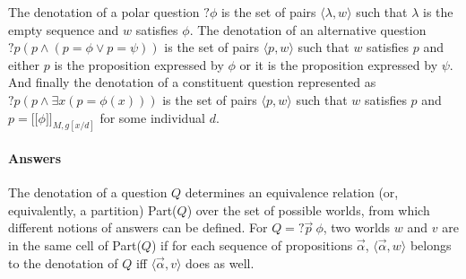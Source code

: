 \documentclass[a4paper, 11pt]{article}
\newcommand\notext[1]{}
\newcommand{\lin}{\ensuremath{\lbrack\!\lbrack}}
\newcommand{\rin}{\ensuremath{\rbrack\!\rbrack}}
\begin{document}
 
  
\noindent The denotation of a  polar question $?  \phi$ is the set of pairs $\langle  \lambda, w \rangle$ such that $\lambda$ is the empty sequence and $w$ satisfies $ \phi$.
 The denotation of an alternative question $?p (p \wedge    (p=\phi \vee p=\psi))$ is the set of pairs $\langle  p, w \rangle$ such that $w$ satisfies $p$ and either $p$ is the proposition expressed by $ \phi $ or it is the proposition expressed by $  \psi $. And finally the denotation of a constituent question represented as  $ ?p ( p \wedge \exists x (p=\phi(x)) )$ is the set of pairs $\langle  p, w \rangle$ such that $w$ satisfies $p$ and $p=\lin \phi\rin_{M,g[x/d]} $ for some individual $d$. 

   
   
\notext{The denotation $\lin ? \phi\rin_{M,g} $ of a  polar question $?  \phi$ is   the set of pairs $\langle  \lambda, w \rangle$ such that $\lambda$ is the empty sequence and $w$ satisfies $  \phi$.
 The denotation of an alternative question $?p (p \wedge    (p=\phi \vee p=\psi))$ is the set of pairs $\langle  p, w \rangle$ such that $w\in p$ and either $p=\lin  \phi\rin_{M,g}$   or   $p=\lin  \psi\rin_{M,g} $. And finally the denotation of a constituent question  $ ?p ( p \wedge \exists x (p=\phi(x)) )$ is the set of pairs $\langle  p, w \rangle$ such that $w\in p$ and $p=\lin \phi\rin_{M,g[x/d]} $ for some individual $d$. }
 
 \notext{Definition \ref{qden} assigns then the following denotations to  polar, alternative and constituent questions:
\ex.  
\a.   $\lin ?\phi\rin_{M,g}=\{\langle \lambda, w \rangle \mid  w \in \lin \phi \rin_{M,g}  \}$
\b.    $\lin?p (p \wedge    (p=\phi \vee p=\psi))\rin_{M,g}  =
 \{\langle    p , w \rangle \mid p =\lin \phi\rin_{M, g} $ or $p= \lin \psi\rin_{M,g} \ \& \  w \in p \}$
\c.   $\lin?p ( p \wedge \exists x (p=\phi(x)) )\rin_{M,g} = \{ \langle p, w\rangle \mid \exists d: p=  \lin \phi\rin_{M,g[x/d]} \ \& \ w \in p \}$

  
 
  

} 
\paragraph{Answers} The denotation   of a question  $Q$ determines
an equivalence relation (or, equivalently, a partition) Part($Q$)
over the set of possible worlds, from which different notions of
answers can be defined. For $Q=?\vec{p}  \ \phi$, two worlds $w$ and $v$ are in the same
cell of Part($Q$) if for each sequence of propositions $\vec{\alpha}$, $\langle \vec{\alpha}, w\rangle $   belongs to    the denotation of $Q$  iff $\langle \vec{\alpha}, v\rangle $ does as well. 
\end{document}
